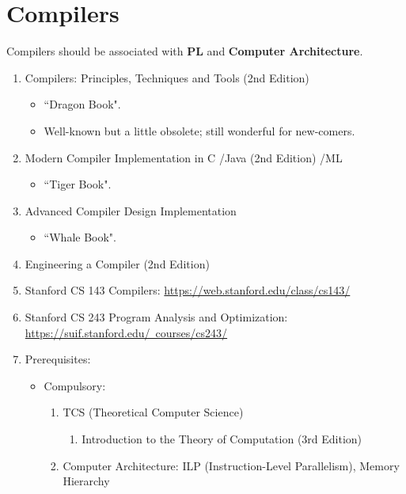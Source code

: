 \documentclass{article}
\begin{document}
\section{Compilers}
Compilers should be associated with \textbf{PL} and \textbf{Computer Architecture}.
\begin{enumerate}
    \item Compilers: Principles, Techniques and Tools (2nd Edition) \cite{aho2007compilers}
    \begin{itemize}
        \item ``Dragon Book".
        \item Well-known but a little obsolete; still wonderful for new-comers.
    \end{itemize}
    \item Modern Compiler Implementation in C \cite{appel2004modern}/Java (2nd Edition) \cite{appel2003modern}/ML \cite{appel1998modern}
    \begin{itemize}
        \item ``Tiger Book".
    \end{itemize}
    \item Advanced Compiler Design Implementation \cite{muchnick1997advanced}
    \begin{itemize}
        \item ``Whale Book".
    \end{itemize}
    \item Engineering a Compiler (2nd Edition) \cite{cooper2011engineering}
    \item Stanford CS 143 Compilers:
    \href{https://web.stanford.edu/class/cs143/}{https://web.stanford.edu/class/cs143/}
    \item Stanford CS 243 Program Analysis and Optimization:\\
    \href{https://suif.stanford.edu/~courses/cs243/}{https://suif.stanford.edu/~courses/cs243/}
    \item Prerequisites:
    \begin{itemize}
        \item Compulsory:
        \begin{enumerate}
        \item TCS (Theoretical Computer Science)
        \begin{enumerate}
            \item Introduction to the Theory of Computation (3rd Edition) \cite{sipser1996introduction}
        \end{enumerate}
        \item Computer Architecture: ILP (Instruction-Level Parallelism), Memory Hierarchy

\end{enumerate}
\end{itemize}
\end{enumerate}
\end{document}
